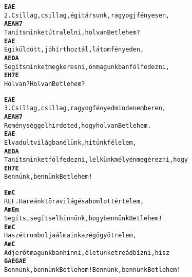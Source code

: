 \cleardoublepage
{}
\kottastart
{}
\kottaend
\begin{minipage}{\textwidth}
\begin{alltt}
\textbf{     E                             A            E}
2. Csillag, csillag, égi társunk, ragyogj fényesen,
\textbf{    A            E            A            H7}
   Taníts minket útra lelni, hol van Betlehem?
\textbf{   E                             A          E}
   Égi küldött, jó hírt hoztál, látom fényeden,
\textbf{    A             E          D            A}
   Segíts minket megkeresni, önmagunkban fölfedezni,
\textbf{    E        H7           E}
   Hol van? Hol van Betlehem?
\end{alltt}
\vspace{0.0cm}
\versszakspacing
\end{minipage}
\begin{minipage}{\textwidth}
\begin{alltt}
\textbf{     E                              A          E}
3. Csillag, csillag, ragyog fényed minden emberen,
\textbf{    A            E              A            H7}
   Reménységgel hirdeted, hogy hol van Betlehem.
\textbf{   E                         A          E}
   Elvadult világban élünk, hitünk félelem,
\textbf{    A             E           D              A}
   Taníts minket fölfedezni, lelkünk mélyén megérezni, hogy
\textbf{    E        H7           E}
   Bennünk, bennünk Betlehem!
\end{alltt}
\vspace{0.0cm}
\versszakspacing
\end{minipage}
\begin{minipage}{\textwidth}
\begin{alltt}
\textbf{         Em                     C}
REF. Ha reánk tör a világ és a bomlott értelem,
\textbf{      Am                             Em}
     Segíts, segíts elhinnünk, hogy bennünk Betlehem!
\textbf{          Em                    C}
     Ha szétrombolja álmaink az égő gyötrelem,
\textbf{     Am                        C}
     Adj erőt magunkban hinni, életünket reád bízni, hisz
\textbf{      G        A            E    G        A            E}
     Bennünk, bennünk Betlehem! Bennünk, bennünk Betlehem!
\end{alltt}
\vspace{0.0cm}
\versszakspacing
\end{minipage}
~\vspace{1.0cm}
\newline
